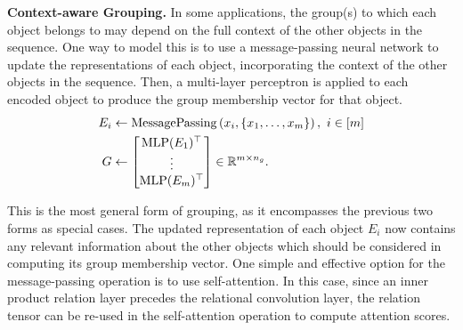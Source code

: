 \textbf{Context-aware Grouping.} In some applications, the group(s) to which each object belongs to may depend on the full context of the other objects in the sequence. One way to model this is to use a message-passing neural network to update the representations of each object, incorporating the context of the other objects in the sequence. Then, a multi-layer perceptron is applied to each encoded object to produce the group membership vector for that object.
\begin{equation}\label{eq:context_grouping}
    \begin{split}
        E_i &\gets \mathrm{MessagePassing}\left(x_i, \left\{x_1, \ldots, x_m\right\}\right), \ i \in [m] \\
        G &\gets \begin{bmatrix}\mathrm{MLP}(E_1)^\top \\ \vdots \\ \mathrm{MLP}(E_m)^\top \end{bmatrix} \in \mathbb{R}^{m \times n_g}.
    \end{split}
\end{equation}

This is the most general form of grouping, as it encompasses the previous two forms as special cases. The updated representation of each object $E_i$ now contains any relevant information about the other objects which should be considered in computing its group membership vector. One simple and effective option for the message-passing operation is to use self-attention. In this case, since an inner product relation layer precedes the relational convolution layer, the relation tensor can be re-used in the self-attention operation to compute attention scores.